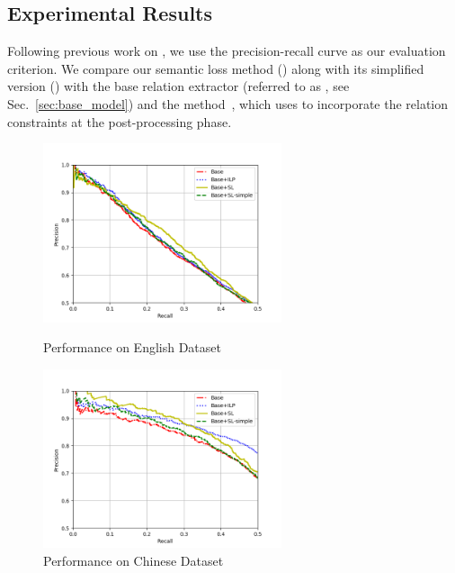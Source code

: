 \subsection{Experimental Results}
Following previous work on \RE, we use the precision-recall curve as our evaluation criterion.
We compare our semantic loss method (\SL) along with its simplified version (\SLsimple) with the base relation extractor (referred to as \base, see Sec.~\ref{sec:base_model}) and the \ILP method~\cite{chen2014encoding}, which uses \ILP to incorporate the relation constraints at the post-processing phase.
\begin{figure}[h]
	\centering
	\begin{minipage}[t]{0.45\textwidth}
		\centering
		\includegraphics[width=7cm]{./result-figure/DBpedia-CNN-result.png}
		\caption{Performance on English Dataset}
		\label{fig:dbpedia}
	\end{minipage}
	\begin{minipage}[t]{0.45\textwidth}
		\centering
		\includegraphics[width=7cm]{./result-figure/Chinese-CNN-result.png}
		\caption{Performance on Chinese Dataset}
		\label{fig:chinese}
	\end{minipage}
\end{figure}

